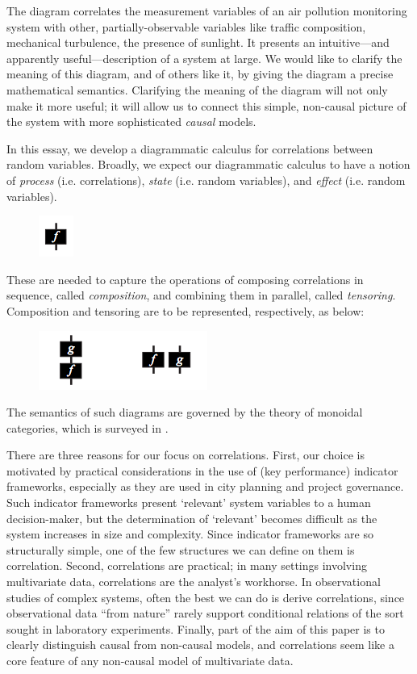 \documentclass{sig-alternate-05-2015}
\theoremstyle{plain}
\theoremstyle{plain}
\theoremstyle{remark}
\begin{document}
The diagram correlates the measurement variables of an air pollution monitoring system with other, partially-observable variables like traffic composition, mechanical turbulence, the presence of sunlight. It presents an intuitive---and apparently useful---description of a system at large. We would like to clarify the meaning of this diagram, and of others like it, by giving the diagram a precise mathematical semantics. Clarifying the meaning of the diagram will not only make it more useful; it will allow us to connect this simple, non-causal picture of the system with more sophisticated \emph{causal} models.

In this essay, we develop a diagrammatic calculus for correlations between random variables. Broadly, we expect our diagrammatic calculus to have a notion of \emph{process} (i.e. correlations), \emph{state} (i.e. random variables), and \emph{effect} (i.e. random variables). 
\begin{figure}[h!]
\centering
\includegraphics{process}
\end{figure}
These are needed to capture the operations of composing correlations in sequence, called \emph{composition}, and combining them in parallel, called \emph{tensoring}. Composition and tensoring are to be represented, respectively, as below:
\begin{figure}[h!]
\centering
\includegraphics{composition}
\end{figure}

The semantics of such diagrams are governed by the theory of monoidal categories, which is surveyed in \cite{selinger09}.

There are three reasons for our focus on correlations. First, our choice is motivated by practical considerations in the use of (key performance) indicator frameworks, especially as they are used in city planning and project governance. Such indicator frameworks present `relevant' system variables to a human decision-maker, but the determination of `relevant' becomes difficult as the system increases in size and complexity. Since indicator frameworks are so structurally simple, one of the few structures we can define on them is correlation. Second, correlations are practical; in many settings involving multivariate data, correlations are the analyst's workhorse. In observational studies of complex systems, often the best we can do is derive correlations, since observational data ``from nature'' rarely support conditional relations of the sort sought in laboratory experiments. Finally, part of the aim of this paper is to clearly distinguish causal from non-causal models, and correlations seem like a core feature of any non-causal model of multivariate data. %
\end{document}
